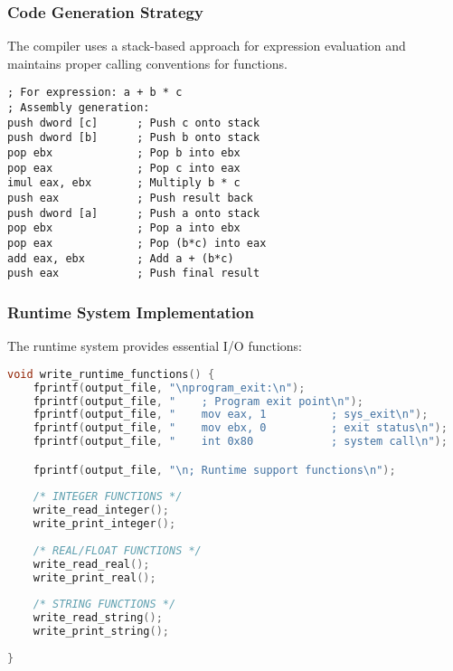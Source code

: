 \documentclass[12pt,a4paper]{article}
\begin{document}
\subsubsection{Code Generation Strategy}

The compiler uses a stack-based approach for expression evaluation and maintains proper calling conventions for functions.

\begin{lstlisting}[caption={Expression Evaluation Example}]
; For expression: a + b * c
; Assembly generation:
push dword [c]      ; Push c onto stack
push dword [b]      ; Push b onto stack
pop ebx             ; Pop b into ebx
pop eax             ; Pop c into eax
imul eax, ebx       ; Multiply b * c
push eax            ; Push result back
push dword [a]      ; Push a onto stack
pop ebx             ; Pop a into ebx
pop eax             ; Pop (b*c) into eax
add eax, ebx        ; Add a + (b*c)
push eax            ; Push final result
\end{lstlisting}

\subsubsection{Runtime System Implementation}

The runtime system provides essential I/O functions:

\begin{lstlisting}[language=C, caption={runtime functions}]
void write_runtime_functions() {
	fprintf(output_file, "\nprogram_exit:\n");
    fprintf(output_file, "    ; Program exit point\n");
    fprintf(output_file, "    mov eax, 1          ; sys_exit\n");
    fprintf(output_file, "    mov ebx, 0          ; exit status\n");
    fprintf(output_file, "    int 0x80            ; system call\n");

    fprintf(output_file, "\n; Runtime support functions\n");
    
    /* INTEGER FUNCTIONS */
    write_read_integer();
    write_print_integer();
    
    /* REAL/FLOAT FUNCTIONS */
    write_read_real();
    write_print_real();
    
    /* STRING FUNCTIONS */
    write_read_string();
    write_print_string();
    
}
\end{lstlisting}
\end{document}
